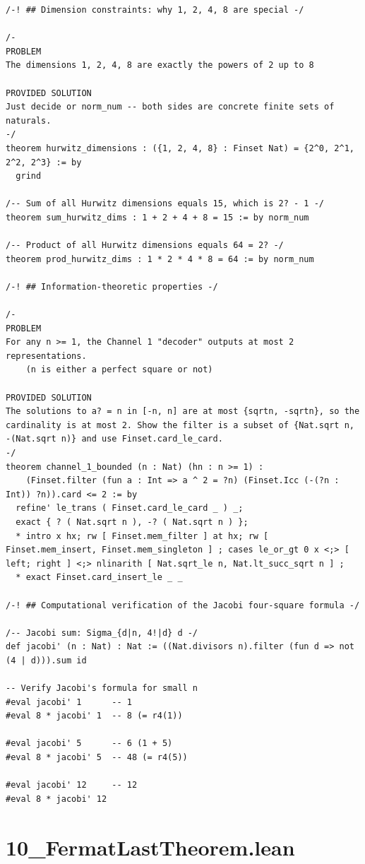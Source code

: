 \documentclass[11pt,twoside,openright]{book}
\theoremstyle{definition}
\theoremstyle{remark}
\begin{document}
\begin{lstlisting}[style=lean]
/-! ## Dimension constraints: why 1, 2, 4, 8 are special -/

/-
PROBLEM
The dimensions 1, 2, 4, 8 are exactly the powers of 2 up to 8

PROVIDED SOLUTION
Just decide or norm_num -- both sides are concrete finite sets of naturals.
-/
theorem hurwitz_dimensions : ({1, 2, 4, 8} : Finset Nat) = {2^0, 2^1, 2^2, 2^3} := by
  grind

/-- Sum of all Hurwitz dimensions equals 15, which is 2? - 1 -/
theorem sum_hurwitz_dims : 1 + 2 + 4 + 8 = 15 := by norm_num

/-- Product of all Hurwitz dimensions equals 64 = 2? -/
theorem prod_hurwitz_dims : 1 * 2 * 4 * 8 = 64 := by norm_num

/-! ## Information-theoretic properties -/

/-
PROBLEM
For any n >= 1, the Channel 1 "decoder" outputs at most 2 representations.
    (n is either a perfect square or not)

PROVIDED SOLUTION
The solutions to a? = n in [-n, n] are at most {sqrtn, -sqrtn}, so the cardinality is at most 2. Show the filter is a subset of {Nat.sqrt n, -(Nat.sqrt n)} and use Finset.card_le_card.
-/
theorem channel_1_bounded (n : Nat) (hn : n >= 1) :
    (Finset.filter (fun a : Int => a ^ 2 = ?n) (Finset.Icc (-(?n : Int)) ?n)).card <= 2 := by
  refine' le_trans ( Finset.card_le_card _ ) _;
  exact { ? ( Nat.sqrt n ), -? ( Nat.sqrt n ) };
  * intro x hx; rw [ Finset.mem_filter ] at hx; rw [ Finset.mem_insert, Finset.mem_singleton ] ; cases le_or_gt 0 x <;> [ left; right ] <;> nlinarith [ Nat.sqrt_le n, Nat.lt_succ_sqrt n ] ;
  * exact Finset.card_insert_le _ _

/-! ## Computational verification of the Jacobi four-square formula -/

/-- Jacobi sum: Sigma_{d|n, 4!|d} d -/
def jacobi' (n : Nat) : Nat := ((Nat.divisors n).filter (fun d => not (4 | d))).sum id

-- Verify Jacobi's formula for small n
#eval jacobi' 1      -- 1
#eval 8 * jacobi' 1  -- 8 (= r4(1))

#eval jacobi' 5      -- 6 (1 + 5)
#eval 8 * jacobi' 5  -- 48 (= r4(5))

#eval jacobi' 12     -- 12
#eval 8 * jacobi' 12
\end{lstlisting}

\clearpage

\section*{10\_FermatLastTheorem.lean}
\end{document}
